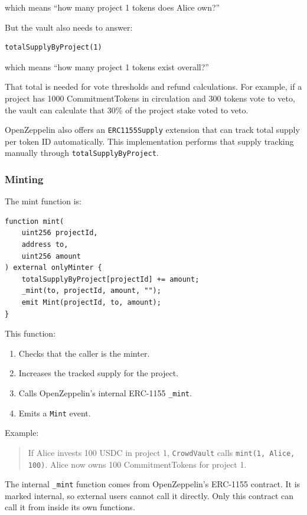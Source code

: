 \documentclass[11pt,a4paper]{article}
\begin{document}
which means ``how many project 1 tokens does Alice own?''

But the vault also needs to answer:

\begin{lstlisting}
totalSupplyByProject(1)
\end{lstlisting}

which means ``how many project 1 tokens exist overall?''

That total is needed for vote thresholds and refund calculations. For example, if a project has 1000 CommitmentTokens in circulation and 300 tokens vote to veto, the vault can calculate that 30\% of the project stake voted to veto.

OpenZeppelin also offers an \texttt{ERC1155Supply} extension that can track total supply per token ID automatically. This implementation performs that supply tracking manually through \texttt{totalSupplyByProject}.

\subsubsection{Minting}

The mint function is:

\begin{lstlisting}
function mint(
    uint256 projectId,
    address to,
    uint256 amount
) external onlyMinter {
    totalSupplyByProject[projectId] += amount;
    _mint(to, projectId, amount, "");
    emit Mint(projectId, to, amount);
}
\end{lstlisting}

This function:

\begin{enumerate}
  \item Checks that the caller is the minter.
  \item Increases the tracked supply for the project.
  \item Calls OpenZeppelin's internal ERC-1155 \texttt{\_mint}.
  \item Emits a \texttt{Mint} event.
\end{enumerate}

Example:

\begin{quote}
If Alice invests 100 USDC in project 1, \texttt{CrowdVault} calls \texttt{mint(1, Alice, 100)}. Alice now owns 100 CommitmentTokens for project 1.
\end{quote}

The internal \texttt{\_mint} function comes from OpenZeppelin's ERC-1155 contract. It is marked internal, so external users cannot call it directly. Only this contract can call it from inside its own functions.
\end{document}
